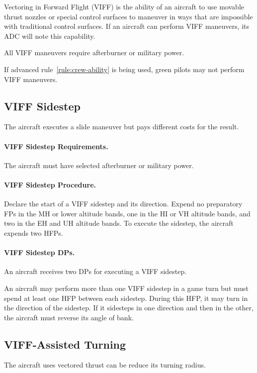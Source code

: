 \begin{advancedrules}
{}{

Vectoring in Forward Flight (VIFF) is the ability of an aircraft to use movable thrust nozzles or special control surfaces to maneuver in ways that are impossible with traditional control surfaces. If an aircraft can perform VIFF maneuvers, its ADC will note this capability.

All VIFF maneuvers require afterburner or military power.

If advanced rule~\ref{rule:crew-ability} is being used, green pilots may not perform VIFF maneuvers.

\subsection{VIFF Sidestep}

The aircraft executes a slide maneuver but pays different costs for the result.

\paragraph{VIFF Sidestep Requirements.} The aircraft must have selected afterburner or military power.

\paragraph{VIFF Sidestep Procedure.} Declare the start of a VIFF sidestep and its direction. Expend no preparatory FPs in the MH or lower altitude bands, one in the HI or VH altitude bands, and two in the EH and UH altitude bands. To execute the sidestep, the aircraft expends two HFPs.

\paragraph{VIFF Sidestep DPs.} An aircraft receives two DPs for executing a VIFF sidestep.

An aircraft may perform more than one VIFF sidestep in a game turn but must spend at least one HFP between each sidestep. During this HFP, it may turn in the direction of the sidestep. If it sidesteps in one direction and then in the other, the aircraft must reverse its angle of bank.

\subsection{VIFF-Assisted Turning}

The aircraft uses vectored thrust can be reduce its turning radius. 

}
\end{advancedrules}
